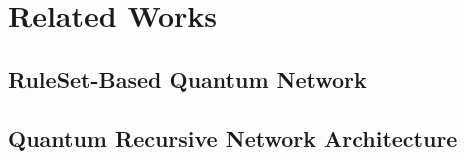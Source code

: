 \chapter{Related Works}
\label{related works}

\section{RuleSet-Based Quantum Network}
\section{Quantum Recursive Network Architecture}
